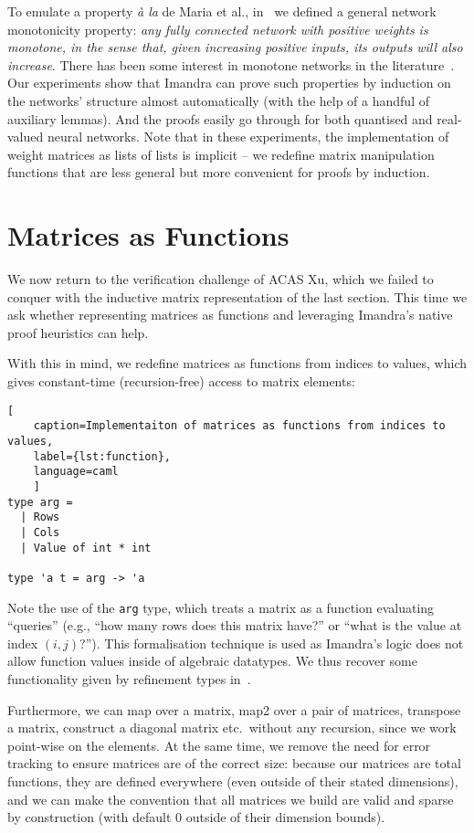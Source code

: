 \documentclass[runningheads]{llncs}
\begin{document}
To emulate a property \emph{\`a la} de Maria et al.,  in~\cite{DPKD22} we  defined a general network monotonicity property: \emph{any fully connected
network with positive weights is \emph{monotone}, in the sense that, given
increasing positive inputs, its outputs will also increase}. There has been some
interest in monotone networks in the literature~\cite{JS98,WehenkelL19}.
Our experiments show that Imandra can prove such properties by induction on the networks'
structure almost automatically (with the help of a handful of auxiliary lemmas). And the proofs easily go through for both quantised and real-valued neural networks. Note that in these experiments, the implementation of weight matrices as lists of lists is implicit -- we redefine matrix manipulation functions that are less general but more convenient for proofs by induction.


\section{Matrices as Functions} \label{sec:function}

We now return to the verification challenge of ACAS Xu, which we failed to conquer with the inductive matrix representation of the last section.
This time we ask whether representing matrices as functions and leveraging Imandra's native proof heuristics can help.

With this in mind, we redefine matrices as functions from indices to values, which gives
constant-time (recursion-free) access to matrix elements:

\begin{lstlisting}[
	caption=Implementaiton of matrices as functions from indices to values,
	label={lst:function},
	language=caml
	]
type arg =
  | Rows
  | Cols
  | Value of int * int

type 'a t = arg -> 'a
\end{lstlisting}

Note the use of the \lstinline{arg} type, which treats a matrix as a function evaluating ``queries'' (e.g., ``how many rows does this matrix have?'' or ``what is the value at index $(i,j)$?''). This formalisation technique is used as Imandra's logic does not allow function values inside of algebraic datatypes. %
We thus recover some functionality given by refinement types in~\cite{KokkeKKAA20}.  

Furthermore, we can map over a matrix, map2 over a pair of matrices, transpose a
matrix, construct a diagonal matrix etc.\ without any recursion, since we work
point-wise on the elements. At the same time, we remove the need for error
tracking to ensure matrices are of the correct size: because our matrices are
total functions, they are defined everywhere (even outside of their stated
dimensions), and we can make the convention that all matrices we build are valid
and sparse by construction (with default 0 outside of their dimension bounds).
\end{document}
